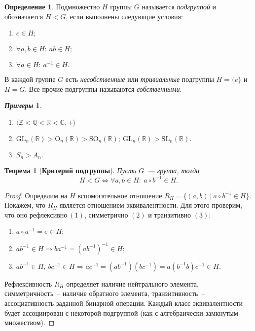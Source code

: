 \documentclass[a4paper, 14pt]{extarticle}
\newcommand{\n}{\par}
\newcommand{\integers}{\mathbb{Z}}
\newcommand{\rationals}{\mathbb{Q}}
\newcommand{\real}{\mathbb{R}}
\newcommand{\complex}{\mathbb{C}}
\newcommand{\GL}{\mathrm{GL}}
\newcommand{\SL}{\mathrm{SL}}
\newcommand{\Orth}{\mathrm{O}}
\newcommand{\SOrth}{\mathrm{SO}}
\theoremstyle{definition}
\newtheorem*{exmpls}{\textit{Примеры}}
\newtheorem{definition}{Определение}
\theoremstyle{plain}
\newtheorem*{theorem*}{Теорема}
\numberwithin{theorem}{section}
\numberwithin{definition}{section}
\numberwithin{statement}{section}
\numberwithin{lemma}{section}
\numberwithin{consequence}{section}
\begin{document}
	\begin{definition}	
		Подмножество $H$ группы $G$ называется \textit{подгруппой} и обозначается $H < G$, если выполнены следующие условия:
		\begin{enumerate}
			\setlength\itemsep{0.1em}
			\item $e \in H;$
			\item $\forall a,b \in H{:} \ ab \in H;$
			\item $\forall a \in H{:} \ a^{-1} \in H.$
		\end{enumerate}
	\end{definition}
	В каждой группе $G$ есть \textit{несобственные} или \textit{тривиальные} подгруппы $H = \{e\}$ и $H = G$. Все прочие подгруппы называются \textit{собственными}.
	\begin{exmpls}
		\
		\begin{enumerate}
			\setlength\itemsep{0.1em}
			\item ${\langle \integers < \rationals < \real < \complex, + \rangle}$
			\item ${\GL_n(\real) > \Orth_n(\real) > \SOrth_n(\real); \ \GL_n(\real) > \SL_n(\real).}$
			\item ${S_n > A_n.}$
		\end{enumerate}
	\end{exmpls}
	\begin{theorem*}[\textbf{Критерий подгруппы}]
		Пусть $G$~--- группа, тогда
		\begin{equation*}
			H < G \Longleftrightarrow \forall a,b \in H{:} \ a \circ b^{-1} \in H.
		\end{equation*}
	\end{theorem*}
	\begin{proof}
		Определим на $H$ вспомогательное отношение ${R_H = \{(a,b)\ | \ a \circ b^{-1} \in H\}}.$ Покажем, что $R_H$ является отношением эквивалентности. Для этого проверим, что оно ${\text{рефлексивно} \ (1)}$, симметрично $(2)$ и транзитивно $(3)$:
		\begin{enumerate}
			\setlength\itemsep{0.1em}
			\item $a \circ a^{-1} = e \in H;$
			\item $ab^{-1} \in H \Longrightarrow b a^{-1} = (ab^{-1})^{-1} \in H;$
			\item $ab^{-1} \in H, \ bc^{-1} \in H \Longrightarrow ac^{-1} = (ab^{-1})(bc^{-1}) = a(b^{-1}b)c^{-1} \in H.$
		\end{enumerate} \n
		
		Рефлексивность $R_H$ определяет наличие нейтрального элемента, симметричность~-- наличие обратного элемента, транзитивность~-- ассоциативность заданной бинарной операции. Каждый класс эквивалентности будет ассоциирован с некоторой подгруппой (как с алгебраически замкнутым множеством). 
	\end{proof}
\end{document}
